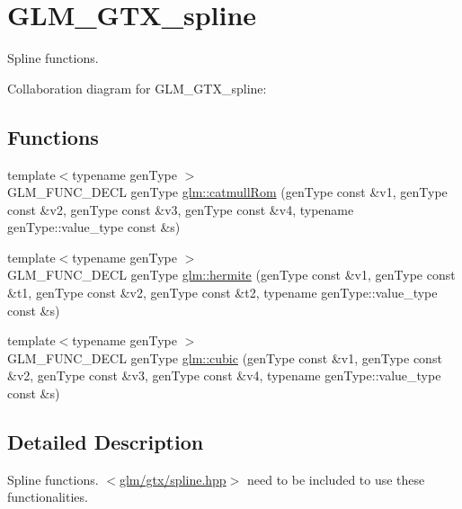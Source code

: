 \hypertarget{group__gtx__spline}{\section{G\-L\-M\-\_\-\-G\-T\-X\-\_\-spline}
\label{group__gtx__spline}
}


Spline functions.  


Collaboration diagram for G\-L\-M\-\_\-\-G\-T\-X\-\_\-spline\-:
\subsection*{Functions}
\begin{DoxyCompactItemize}
\item 
{\footnotesize template$<$typename gen\-Type $>$ }\\G\-L\-M\-\_\-\-F\-U\-N\-C\-\_\-\-D\-E\-C\-L gen\-Type \hyperlink{group__gtx__spline_ga8119c04f8210fd0d292757565cd6918d}{glm\-::catmull\-Rom} (gen\-Type const \&v1, gen\-Type const \&v2, gen\-Type const \&v3, gen\-Type const \&v4, typename gen\-Type\-::value\-\_\-type const \&s)
\item 
{\footnotesize template$<$typename gen\-Type $>$ }\\G\-L\-M\-\_\-\-F\-U\-N\-C\-\_\-\-D\-E\-C\-L gen\-Type \hyperlink{group__gtx__spline_gaa69e143f6374d32f934a8edeaa50bac9}{glm\-::hermite} (gen\-Type const \&v1, gen\-Type const \&t1, gen\-Type const \&v2, gen\-Type const \&t2, typename gen\-Type\-::value\-\_\-type const \&s)
\item 
{\footnotesize template$<$typename gen\-Type $>$ }\\G\-L\-M\-\_\-\-F\-U\-N\-C\-\_\-\-D\-E\-C\-L gen\-Type \hyperlink{group__gtx__spline_ga6b867eb52e2fc933d2e0bf26aabc9a70}{glm\-::cubic} (gen\-Type const \&v1, gen\-Type const \&v2, gen\-Type const \&v3, gen\-Type const \&v4, typename gen\-Type\-::value\-\_\-type const \&s)
\end{DoxyCompactItemize}


\subsection{Detailed Description}
Spline functions. $<$\hyperlink{spline_8hpp}{glm/gtx/spline.\-hpp}$>$ need to be included to use these functionalities. 

